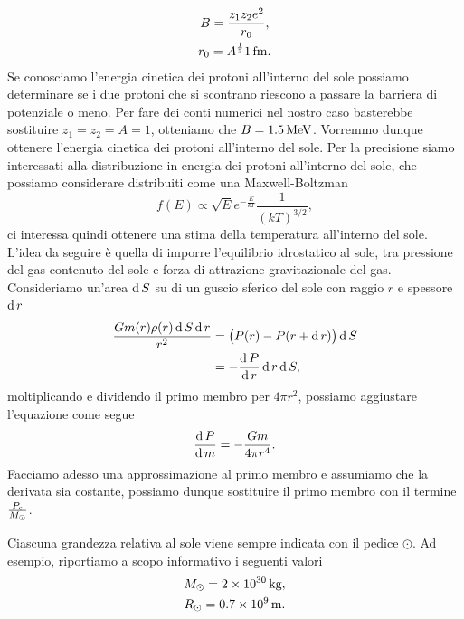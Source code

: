 \begin{gather*}
    B = \frac{z_1 z_2 e^2}{r_0},\\
    r_0 = A^{\frac{1}{3}}1\,\textup{fm}.
\end{gather*}
Se conosciamo l'energia cinetica dei protoni all'interno del sole possiamo determinare se i due protoni che si scontrano riescono a passare la barriera di potenziale o meno. Per fare dei conti numerici nel nostro caso basterebbe sostituire $z_1 = z_2 = A = 1$, otteniamo che $B = 1.5\,\textup{MeV}$. Vorremmo dunque ottenere l'energia cinetica dei protoni all'interno del sole. Per la precisione siamo interessati alla distribuzione in energia dei protoni all'interno del sole, che possiamo considerare distribuiti come una Maxwell-Boltzman
\begin{equation}
    f(E) \varpropto \sqrt{E} e^{-\frac{E}{kT}}\frac{1}{(kT)^{3/2}},\label{eq:maxwellbolz}
\end{equation}
ci interessa quindi ottenere una stima della temperatura all'interno del sole. L'idea da seguire è quella di imporre l'equilibrio idrostatico al sole, tra pressione del gas contenuto del sole e forza di attrazione gravitazionale del gas. Consideriamo un'area $\operatorname{d} S$ su di un guscio sferico del sole con raggio $r$ e spessore $\operatorname{d} r$
\begin{equation*}
    \begin{split}
        \frac{G m(r)\rho(r)\operatorname{d} S \operatorname{d} r}{r^2} & = \bigl(P(r) - P(r+\operatorname{d} r)\bigr)\operatorname{d} S\\
                                               & = -\frac{\operatorname{d} P}{\operatorname{d} r} \operatorname{d} r \operatorname{d} S,
    \end{split}
\end{equation*}
moltiplicando e dividendo il primo membro per $4\pi r^2$, possiamo aggiustare l'equazione come segue
\begin{equation}
    \frac{\operatorname{d} P}{\operatorname{d} m} = - \frac{Gm}{4\pi r^4}.
    \label{eq:sole1}
\end{equation}
Facciamo adesso una approssimazione al primo membro e assumiamo che la derivata sia costante, possiamo dunque sostituire il primo membro con il termine $\frac{P_\textup{c}}{M_\odot}$.
\begin{definition}
    Ciascuna grandezza relativa al sole viene sempre indicata con il pedice $\odot$. Ad esempio, riportiamo a scopo informativo i seguenti valori
    \begin{gather*}
        M_\odot = 2 \times 10^{30}\,\textup{kg},\\
        R_\odot = 0.7 \times 10^{9} \,\textup{m}.
    \end{gather*}
\end{definition}
